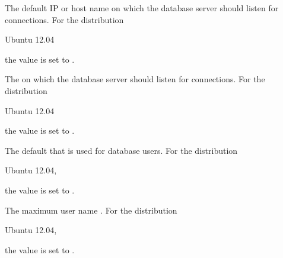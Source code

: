 The default IP  or host name on which the database server should
listen for connections. For the distribution
\begin{inparaitem}
\item[\TheDistribution{ubuntu}] Ubuntu 12.04
\end{inparaitem}
the value is set to .
 

The  on which the database server should
listen for connections. For the distribution
\begin{inparaitem}
\item[\TheDistribution{ubuntu}] Ubuntu 12.04
\end{inparaitem}
the value is set to .
 

The default  that is used for database users.
For the distribution
\begin{inparaitem}
\item[\TheDistribution{ubuntu}] Ubuntu 12.04,
\end{inparaitem}
the value is set to .
 

The maximum user name .
For the distribution
\begin{inparaitem}
\item[\TheDistribution{ubuntu}] Ubuntu 12.04,
\end{inparaitem}
the value is set to .
 
